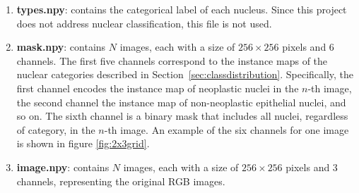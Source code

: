 \documentclass[target=bach,aauheader=,style=]{thud}
\begin{document}
\begin{enumerate}
    \item \textbf{types.npy}: contains the categorical label of each nucleus. Since this project does not address nuclear classification, this file is not used.
    
    \item \textbf{mask.npy}: contains $N$ images, each with a size of $256 \times 256$ pixels and 6 channels.  
    The first five channels correspond to the instance maps of the nuclear categories described in Section~\ref{sec:classdistribution}.  
    Specifically, the first channel encodes the instance map of neoplastic nuclei in the $n$-th image, the second channel the instance map of non-neoplastic epithelial nuclei, and so on.  
    The sixth channel is a binary mask that includes all nuclei, regardless of category, in the $n$-th image. An example of the six channels for one image is shown in figure \ref{fig:2x3grid}.
    
    \item \textbf{image.npy}: contains $N$ images, each with a size of $256 \times 256$ pixels and 3 channels, representing the original RGB images.
\end{enumerate}
\end{document}
